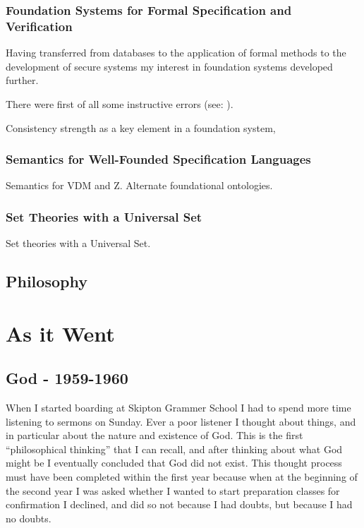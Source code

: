 \documentclass[10pt,titlepage]{book}
\begin{document}
\subsection{Foundation Systems for Formal Specification and Verification}

Having transferred from databases to the application of formal methods to the development of secure systems my interest in foundation systems developed further.

There were first of all some instructive errors (see: \cite{jones86a,jones86b}).

Consistency strength as a key element in a foundation system,

\subsection{Semantics for Well-Founded Specification Languages}

Semantics for VDM and Z.
Alternate foundational ontologies.

\subsection{Set Theories with a Universal Set}
Set theories with a Universal Set.

\section{Philosophy}

\chapter{As it Went}

\section{God - 1959-1960}

When I started boarding at Skipton Grammer School I had to spend more time listening to sermons on Sunday.
Ever a poor listener I thought about things, and in particular about the nature and existence of God.
This is the first ``philosophical thinking'' that I can recall, and after thinking about what God might be I eventually concluded that God did not exist.
This thought process must have been completed within the first year because when at the beginning of the second year I was asked whether I wanted to start preparation classes for confirmation I declined, and did so not because I had doubts, but because I had no doubts.
\end{document}
